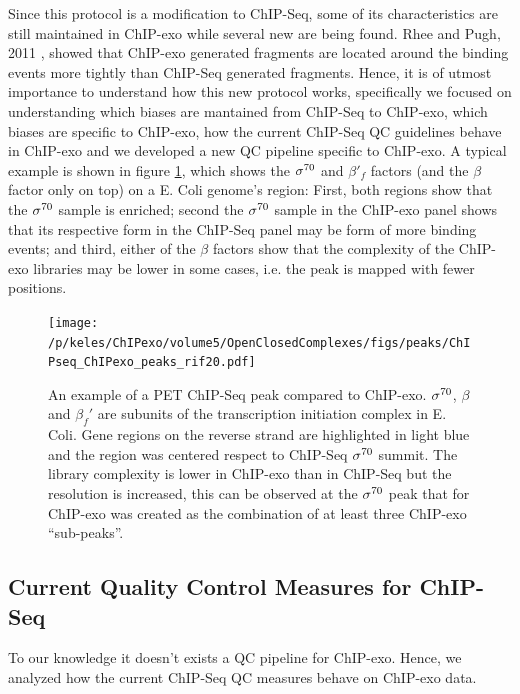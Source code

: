 \documentclass[11pt]{article}\usepackage[]{graphicx}\usepackage[]{color}
\begin{document}
Since this protocol is a modification to ChIP-Seq, some of its
characteristics are still maintained in ChIP-exo while several new are
being found. Rhee and Pugh, 2011 \cite{exo1}, showed that ChIP-exo
generated fragments are located around the binding events more tightly
than ChIP-Seq generated fragments. Hence, it is of utmost importance
to understand how this new protocol works, specifically we focused on
understanding which biases are mantained from ChIP-Seq to ChIP-exo,
which biases are specific to ChIP-exo, how the current ChIP-Seq QC
guidelines behave in ChIP-exo and we developed a new QC pipeline
specific to ChIP-exo. A typical example is shown in figure
\ref{fig:exo_example}, which shows the $\sigma^{70}$ and $\beta'_f$ factors
(and the $\beta$ factor only on top) on a E. Coli genome's region:
First, both regions show that the $\sigma^{70}$ sample is enriched; second
the $\sigma^{70}$ sample in the ChIP-exo panel shows that its respective form
in the ChIP-Seq panel may be form of more binding events; and third,
either of the $\beta$ factors show that the complexity of the ChIP-exo
libraries may be lower in some cases, i.e. the peak is mapped with
fewer positions.

\begin{figure}[h!]
  \centering
  \texttt{[image: /p/keles/ChIPexo/volume5/OpenClosedComplexes/figs/peaks/ChIPseq\_ChIPexo\_peaks\_rif20.pdf]}
  \caption{An example of a PET ChIP-Seq peak compared to
    ChIP-exo. $\sigma^{70}$, $\beta$ and $\beta_f'$ are subunits of
    the transcription initiation complex in E. Coli. Gene regions on
    the reverse strand are highlighted in light blue and the region
    was centered respect to ChIP-Seq $\sigma^{70}$ summit. The library
    complexity is lower in ChIP-exo than in ChIP-Seq but the
    resolution is increased, this can be observed at the $\sigma^{70}$
    peak that for ChIP-exo was created as the combination of at least
    three ChIP-exo ``sub-peaks''.}
  \label{fig:exo_example}
\end{figure}

\subsection{Current Quality Control Measures for ChIP-Seq}
\label{sec:QC_chipseq}

To our knowledge it doesn't exists a QC pipeline for ChIP-exo. Hence,
we analyzed how the current ChIP-Seq QC measures behave on ChIP-exo
data.
\end{document}
